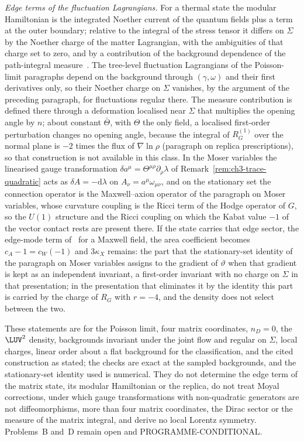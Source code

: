 \emph{Edge terms of the fluctuation Lagrangians.} For a thermal state the modular Hamiltonian is the integrated Noether current of the quantum fields plus a term at the outer boundary; relative to the integral of the stress tensor it differs on \(\Sigma\) by the Noether charge of the matter Lagrangian, with the ambiguities of that charge set to zero, and by a contribution of the background dependence of the path-integral measure~\cite{Chen2022}. The tree-level fluctuation Lagrangians of the Poisson-limit paragraphs depend on the background through \((\gamma,\omega)\) and their first derivatives only, so their Noether charge on \(\Sigma\) vanishes, by the argument of the preceding paragraph, for fluctuations regular there. The measure contribution is defined there through a deformation localised near \(\Sigma\) that multiplies the opening angle by \(n\); about constant \(\bar\Theta\), with \(\Theta\) the only field, a localised first-order perturbation changes no opening angle, because the integral of \(R_G^{(1)}\) over the normal plane is \(-2\) times the flux of \(\nabla\ln\rho\) (paragraph on replica prescriptions), so that construction is not available in this class. In the Moser variables the linearised gauge transformation \(\delta a^\mu=\Theta^{\mu\rho}\partial_\rho\lambda\) of Remark~\ref{rem:ch3-trace-quadratic} acts as \(\delta A=-\mathrm d\lambda\) on \(A_\nu=a^\mu\omega_{\mu\nu}\), and on the stationary set the connection operator is the Maxwell--axion operator of the paragraph on Moser variables, whose curvature coupling is the Ricci term of the Hodge operator of \(G\), so the \(U(1)\) structure and the Ricci coupling on which the Kabat value \(-1\) of the vector contact rests are present there. If the state carries that edge sector, the edge-mode term of~\cite{DonnellyWall2016} for a Maxwell field, the area coefficient becomes \(c_A-1=c_W(-1)\) and \(3\kappa_X\) remains: the part that the stationary-set identity of the paragraph on Moser variables assigns to the gradient of \(\vartheta\) when that gradient is kept as an independent invariant, a first-order invariant with no charge on \(\Sigma\) in that presentation; in the presentation that eliminates it by the identity this part is carried by the charge of \(R_G\) with \(r=-4\), and the density does not select between the two.

These statements are for the Poisson limit, four matrix coordinates, \(n_D=0\), the \(\LUV^2\) density, backgrounds invariant under the joint flow and regular on \(\Sigma\), local charges, linear order about a flat background for the classification, and the cited construction as stated; the checks are exact at the sampled backgrounds, and the stationary-set identity used is numerical. They do not determine the edge term of the matrix state, its modular Hamiltonian or the replica, do not treat Moyal corrections, under which gauge transformations with non-quadratic generators are not diffeomorphisms, more than four matrix coordinates, the Dirac sector or the measure of the matrix integral, and derive no local Lorentz symmetry. Problems~B and~D remain open and PROGRAMME-CONDITIONAL.

